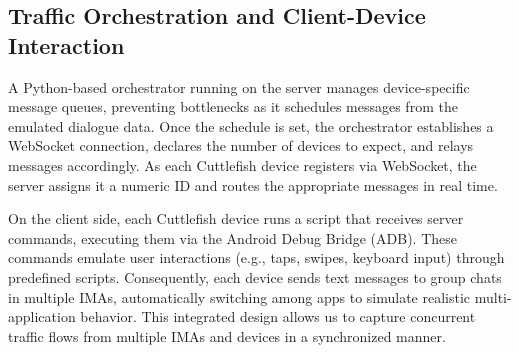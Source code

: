 \documentclass[conference]{IEEEtran}
\begin{document}
\begin{table}[!ht]
\centering
\caption{dialogue schedule snippet}
\label{tab:Top5TrimmedDialogue}
\end{table}

\subsection{Traffic Orchestration and Client-Device Interaction}

A Python-based orchestrator running on the server manages device-specific message queues, preventing bottlenecks as it schedules messages from the emulated dialogue data. Once the schedule is set, the orchestrator establishes a WebSocket connection, declares the number of devices to expect, and relays messages accordingly. As each Cuttlefish device registers via WebSocket, the server assigns it a numeric ID and routes the appropriate messages in real time.

On the client side, each Cuttlefish device runs a script that receives server commands, executing them via the Android Debug Bridge (ADB). These commands emulate user interactions (e.g., taps, swipes, keyboard input) through predefined scripts. Consequently, each device sends text messages to group chats in multiple IMAs, automatically switching among apps to simulate realistic multi-application behavior. This integrated design allows us to capture concurrent traffic flows from multiple IMAs and devices in a synchronized manner.
\end{document}
